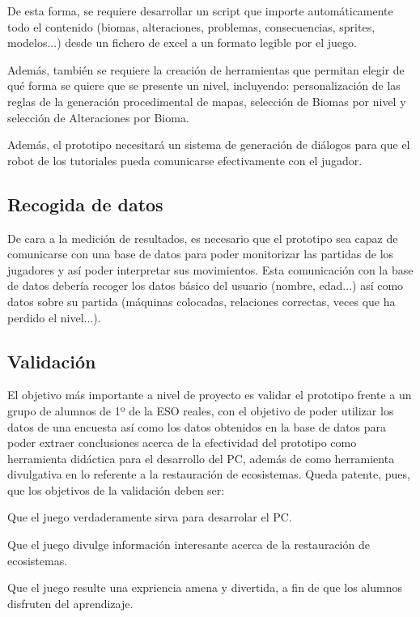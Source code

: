 De esta forma, se requiere desarrollar un script que importe automáticamente todo el contenido (biomas, alteraciones, problemas, consecuencias, sprites, modelos...) desde un fichero de excel a un formato legible por el juego.

Además, también se requiere la creación de herramientas que permitan elegir de qué forma se quiere que se presente un nivel, incluyendo: personalización de las reglas de la generación procedimental de mapas, selección de Biomas por nivel y selección de Alteraciones por Bioma.

Además, el prototipo necesitará un sistema de generación de diálogos para que el robot de los tutoriales pueda comunicarse efectivamente con el jugador.

\subsection{Recogida de datos}

De cara a la medición de resultados, es necesario que el prototipo sea capaz de comunicarse con una base de datos para poder monitorizar las partidas de los jugadores y así poder interpretar sus movimientos. 
Esta comunicación con la base de datos debería recoger los datos básico  del usuario (nombre, edad...) así como datos sobre su partida (máquinas colocadas, relaciones correctas, veces que ha perdido el nivel...).

\subsection{Validación}

El objetivo más importante a nivel de proyecto es validar el prototipo frente a un grupo de alumnos de 1º de la ESO reales, con el objetivo de poder utilizar los datos de una encuesta así como los datos obtenidos en la base de datos para poder extraer conclusiones acerca de la efectividad del prototipo como herramienta didáctica para el desarrollo del PC, además de como herramienta divulgativa en lo referente a la restauración de ecosistemas.
Queda patente, pues, que los objetivos de la validación deben ser:
\begin{compactitem}
    \item Que el juego verdaderamente sirva para desarrolar el PC.
    \item Que el juego divulge información interesante acerca de la restauración de ecosistemas.
    \item Que el juego resulte una expriencia amena y divertida, a fin de que los alumnos disfruten del aprendizaje.
\end{compactitem} 

